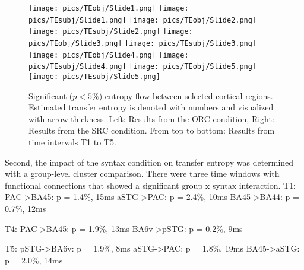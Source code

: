 \begin{figure}[h]
	\begin{center}
		\begin{minipage}{\textwidth}
			\texttt{[image: pics/TEobj/Slide1.png]}
			\texttt{[image: pics/TEsubj/Slide1.png]}
			\texttt{[image: pics/TEobj/Slide2.png]}
			\texttt{[image: pics/TEsubj/Slide2.png]}
			\texttt{[image: pics/TEobj/Slide3.png]}
			\texttt{[image: pics/TEsubj/Slide3.png]}
			\texttt{[image: pics/TEobj/Slide4.png]}
			\texttt{[image: pics/TEsubj/Slide4.png]}
			\texttt{[image: pics/TEobj/Slide5.png]}
			\texttt{[image: pics/TEsubj/Slide5.png]}
		\end{minipage}
			\caption{\label{4.4.networkgraph} Significant ($p < 5\%$) entropy flow between selected cortical regions. Estimated transfer entropy is denoted with numbers and visualized with arrow thickness. Left: Results from the ORC condition, Right: Results from the SRC condition. From top to bottom: Results from time intervals T1 to T5.}
	\end{center}
\end{figure}

Second, the impact of the syntax condition on transfer entropy was determined with a group-level cluster comparison.
There were three time windows with functional connections that showed a significant group x syntax interaction.
T1:
PAC->BA45: p = 1.4\%, 15ms
aSTG->PAC: p = 2.4\%, 10ms
BA45->BA44: p = 0.7\%, 12ms

T4:
PAC->BA45: p = 1.9\%, 13ms
BA6v->pSTG: p = 0.2\%, 9ms

T5:
pSTG->BA6v: p = 1.9\%, 8ms
aSTG->PAC: p = 1.8\%, 19ms
BA45->aSTG: p = 2.0\%, 14ms